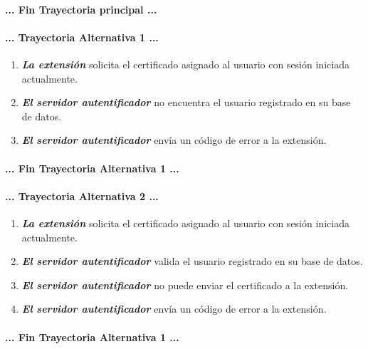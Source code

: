 \documentclass[12pt, a4paper, titlepage]{report}
\begin{document}
		\paragraph{... Fin Trayectoria principal ...}
		
		\paragraph{... Trayectoria Alternativa 1 ...}
		    \begin{enumerate}
		        \item \textbf{\textit{La extensión}} solicita el certificado asignado al usuario con sesión iniciada actualmente.
		        
		        \item \textbf{\textit{El servidor autentificador}} no encuentra el usuario registrado en su base de datos.
		        
		        \item \textbf{\textit{El servidor autentificador}} envía un código de error a la extensión.
		    \end{enumerate}
		\paragraph{... Fin Trayectoria Alternativa 1 ...}
		
		\paragraph{... Trayectoria Alternativa 2 ...}
		    \begin{enumerate}
		        \item \textbf{\textit{La extensión}} solicita el certificado asignado al usuario con sesión iniciada actualmente.
		        
		        \item \textbf{\textit{El servidor autentificador}} valida el usuario registrado en su base de datos.
		        
		        \item \textbf{\textit{El servidor autentificador}} no puede enviar el certificado a la extensión.
		        
		        \item \textbf{\textit{El servidor autentificador}} envía un código de error a la extensión.
		    \end{enumerate}
		\paragraph{... Fin Trayectoria Alternativa 1 ...}
		
\end{document}
